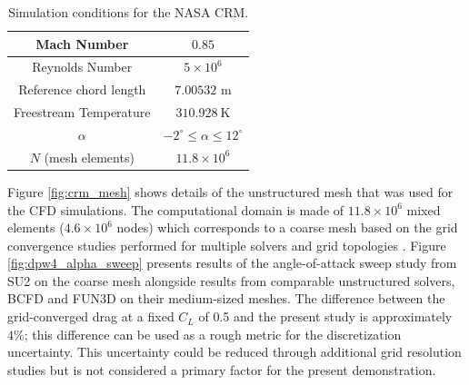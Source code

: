 \begin{table}
\centering
    \captionsetup{justification=centering}
    \caption{Simulation conditions for the NASA CRM.} 
    \begin{tabular}{|c|c|}
        \hline
        Mach Number & $0.85$ \\ \hline
        Reynolds Number & $5\times10^6$ \\ \hline
        Reference chord length & $7.00532$ m \\ \hline
        Freestream Temperature & $310.928~\text{K}$ \\ \hline
        $\alpha$ & $-2^\circ \leq \alpha \leq 12^\circ$ \\ \hline 
        $N$ (mesh elements) &  $11.8\times10^6$ \\ \hline
    \end{tabular}
    \label{NASA_CRM_test_cond}
\end{table}

Figure \ref{fig:crm_mesh} shows details of the unstructured mesh that was used for the CFD simulations. The computational domain is made of $11.8\times10^6$ mixed elements ($4.6\times10^6$ nodes) which corresponds to a coarse mesh based on the grid convergence studies performed for multiple solvers and grid topologies \cite{vassberg_summary_2010}. Figure \ref{fig:dpw4_alpha_sweep} presents results of the angle-of-attack sweep study from SU2 on the coarse mesh alongside results from comparable unstructured solvers, BCFD \cite{winkler_dorgan_cary_mani_2009} and FUN3D \cite{lee-rausch_application_2014} on their medium-sized meshes. 
The difference between the grid-converged drag at a fixed $C_L$ of 0.5 and the present study is approximately $4\%$; this difference can be used as a rough metric for the discretization uncertainty. This uncertainty could be reduced through additional grid resolution studies but is not considered a primary factor for the present demonstration.

